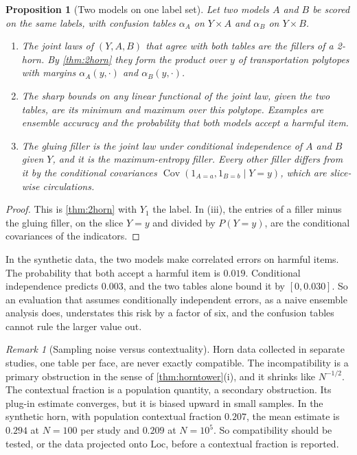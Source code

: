 \documentclass[11pt]{article}
\newtheorem{proposition}[theorem]{Proposition}
\theoremstyle{definition}
\theoremstyle{remark}
\newtheorem{remark}[theorem]{Remark}
\begin{document}
\begin{proposition}[Two models on one label set]\label{prop:twomodels}
Let two models $A$ and $B$ be scored on the same labels, with confusion tables $\alpha_A$ on $Y\times A$ and $\alpha_B$ on $Y\times B$.
\begin{enumerate}[label=(\roman*)]
\item The joint laws of $(Y,A,B)$ that agree with both tables are the fillers of a 2-horn. By \cref{thm:2horn} they form
  the product over $y$ of transportation polytopes with margins $\alpha_A(y,\cdot)$ and $\alpha_B(y,\cdot)$.
\item The sharp bounds on any linear functional of the joint law, given the two tables, are its minimum and maximum
  over this polytope. Examples are ensemble accuracy and the probability that both models accept a harmful item.
\item The gluing filler is the joint law under conditional independence of $A$ and $B$ given $Y$, and it is the
  maximum-entropy filler. Every other filler differs from it by the conditional covariances
  $\operatorname{Cov}(1_{A=a},1_{B=b}\mid Y=y)$, which are slice-wise circulations.
\end{enumerate}
\end{proposition}
\begin{proof}
This is \cref{thm:2horn} with $Y_1$ the label. In (iii), the entries of a filler minus the gluing filler, on the slice $Y=y$
and divided by $P(Y=y)$, are the conditional covariances of the indicators.
\end{proof}

In the synthetic data, the two models make correlated errors on harmful items. The probability that both accept a harmful
item is $0.019$. Conditional independence predicts $0.003$, and the two tables alone bound it by $[0,0.030]$. So an
evaluation that assumes conditionally independent errors, as a naive ensemble analysis does, understates this risk by
a factor of six, and the confusion tables cannot rule the larger value out.

\begin{remark}[Sampling noise versus contextuality]
Horn data collected in separate studies, one table per face, are never exactly compatible. The incompatibility is a
primary obstruction in the sense of \cref{thm:horntower}(i), and it shrinks like $N^{-1/2}$. The contextual fraction is a
population quantity, a secondary obstruction. Its plug-in estimate converges, but it is biased upward in small samples.
In the synthetic horn, with population contextual fraction $0.207$, the mean estimate is $0.294$ at $N=100$ per study and
$0.209$ at $N=10^5$. So compatibility should be tested, or the data projected onto $\mathrm{Loc}$, before a contextual
fraction is reported.
\end{remark}
\end{document}
